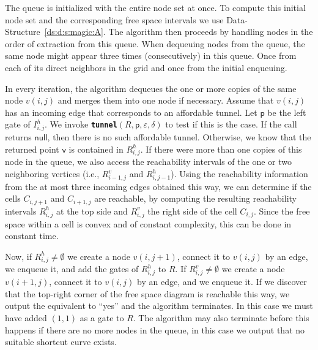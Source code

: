 \documentclass[12pt]{article}
\makeatletter
\newcommand{\AlgorithmI}[1]{{\textcolor[named]{RedViolet}{\texttt{\bf{#1}}}}}
\newcommand{\Algorithm}[1]{{\AlgorithmI{#1}\index{algorithm!#1@{\AlgorithmI{#1}}}}}
\newcommand{\dsref}[1]{Data-Structure~\ref{ds:#1}}
\newcommand{\Reached}{R}
\newcommand{\pnt}{\mathsf{p}}
\newcommand{\pntD}{\mathsf{v}}
\newcommand{\CellXY}[2]{C_{#1,#2}}
\newcommand{\IHCellXY}[2]{I^h_{#1,#2}}
\newcommand{\RVCellXY}[2]{R^v_{#1,#2}}
\newcommand{\RHCellXY}[2]{R^h_{#1,#2}}
\providecommand{\eps}{{\varepsilon}}\renewcommand{\Re}{{\rm I\!\hspace{-0.025em} R}}
\newcommand{\NULL}{\ensuremath{\mathsf{null}}}
\newcommand{\tunnelTest}{\Algorithm{tunnel}\xspace}
\numberwithin{figure}{section}
\numberwithin{equation}{section}
\makeatother
\begin{document}
The queue is initialized with the entire node set at once.  To compute
this initial node set and the corresponding free space intervals we
use \dsref{d:s:magic:A}.  The algorithm then proceeds by handling
nodes in the order of extraction from this queue.  When dequeuing
nodes from the queue, the same node might appear three times
(consecutively) in this queue. Once from each of its direct neighbors
in the grid and once from the initial enqueuing.

In every iteration, the algorithm dequeues the one or more copies of
the same node $v(i,j)$ and merges them into one node if necessary.
Assume that $v(i,j)$ has an incoming edge that corresponds to an
affordable tunnel.  Let $\pnt$ be the left gate of
$\IHCellXY{i}{j}$. We invoke \tunnelTest{}$(R,\pnt,\eps,\delta)$ to
test if this is the case.  If the call returns \NULL, then there is no
such affordable tunnel.  Otherwise, we know that the returned point
$\pntD$ is contained in $\RHCellXY{i}{j}$.
If there were more than one copies of this node in the queue, we also
access the reachability intervals of the one or two neighboring
vertices (i.e., $\RVCellXY{i-1}{j}$ and $\RHCellXY{i}{j-1}$).  Using
the reachability information from the at most three incoming edges
obtained this way, we can determine if the cells $\CellXY{i}{j+1}$ and
$\CellXY{i+1}{j}$ are reachable, by computing the resulting
reachability intervals $\RHCellXY{i}{j}$ at the top side and
$\RVCellXY{i}{j}$ the right side of the cell $\CellXY{i}{j}$.  Since
the free space within a cell is convex and of constant complexity,
this can be done in constant time.

Now, if $\RHCellXY{i}{j} \neq \emptyset$ we create a node $v(i,j+1)$,
connect it to $v(i,j)$ by an edge, we enqueue it, and add the gates of
$\RHCellXY{i}{j}$ to $\Reached$.  If $\RVCellXY{i}{j} \neq \emptyset$
we create a node $v(i+1,j)$, connect it to $v(i,j)$ by an edge, and we
enqueue it.  If we discover that the top-right corner of the free
space diagram is reachable this way, we output the equivalent to
``yes'' and the algorithm terminates. In this case we must have added
$(1,1)$ as a gate to $\Reached$.  The algorithm may also terminate
before this happens if there are no more nodes in the queue, in this
case we output that no suitable shortcut curve exists.
\end{document}
